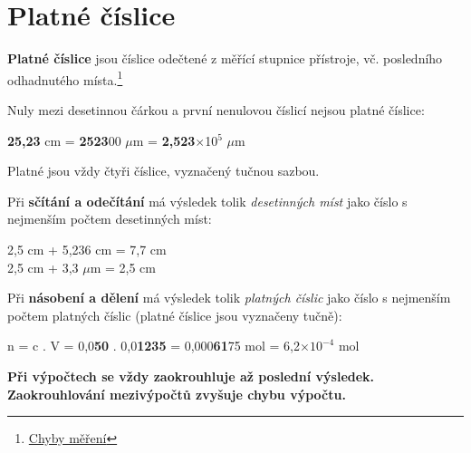 
\section{Platné číslice}

\textbf{Platné číslice} jsou číslice odečtené z měřící stupnice přístroje, vč. posledního odhadnutého místa.\footnote{\href{https://is.muni.cz/do/sci/UChem/um/laboratorni_technika/pages/uvod.html}{Chyby měření}}

Nuly mezi desetinnou čárkou a první nenulovou číslicí nejsou platné číslice:

\textbf{25,23} cm = \textbf{2523}00 $\mu$m = \textbf{2,523}$\times$10$^5$ $\mu$m

Platné jsou vždy čtyři číslice, vyznačený tučnou sazbou.

Při \textbf{sčítání a odečítání} má výsledek tolik \textit{desetinných míst} jako číslo s nejmenším počtem desetinných míst:

2,5 cm + 5,236 cm = 7,7 cm\\
2,5 cm + 3,3 $\mu$m = 2,5 cm

Při \textbf{násobení a dělení} má výsledek tolik \textit{platných číslic} jako číslo s nejmenším počtem platných číslic (platné číslice jsou vyznačeny tučně):

n = c . V = 0,0\textbf{50} . 0,0\textbf{1235} = 0,000\textbf{61}75 mol = 6,2$\times10^{-4}$ mol

\textbf{Při výpočtech se vždy zaokrouhluje až poslední výsledek. Zaokrouhlování mezivýpočtů zvyšuje chybu výpočtu.}